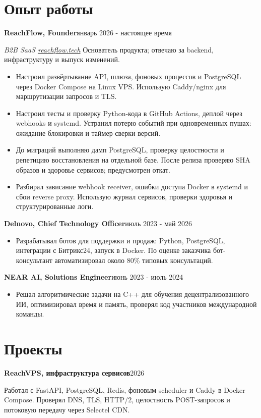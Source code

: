 \documentclass[10pt,a4paper]{article}
\newcommand{\role}[2]{\textbf{#1}\hfill #2\par}
\begin{document}
\section{Опыт работы}
\role{ReachFlow, Founder}{январь 2026 - настоящее время}
\textit{B2B SaaS \textperiodcentered{} \href{https://reachflow.tech}{reachflow.tech}}
Основатель продукта; отвечаю за backend, инфраструктуру и выпуск изменений.
\begin{itemize}
  \item Настроил развёртывание API, шлюза, фоновых процессов и PostgreSQL через Docker Compose
        на Linux VPS. Использую Caddy/nginx для маршрутизации запросов и TLS.
  \item Настроил тесты и проверку Python-кода в GitHub Actions, деплой через webhooks и systemd.
        Устранил потерю событий при одновременных пушах: ожидание блокировки и таймер сверки версий.
  \item До миграций выполняю дамп PostgreSQL, проверку целостности и репетицию восстановления
        на отдельной базе. После релиза проверяю SHA образов и здоровье сервисов; предусмотрен откат.
  \item Разбирал зависание webhook receiver, ошибки доступа Docker в systemd и сбои reverse proxy.
        Использую журнал сервисов, проверки здоровья и структурированные логи.
\end{itemize}
\vspace{2pt}

\role{Delnovo, Chief Technology Officer}{июль 2023 - май 2026}
\begin{itemize}
  \item Разрабатывал ботов для поддержки и продаж: Python, PostgreSQL, интеграции с Битрикс24,
        запуск в Docker. По оценке заказчика бот-консультант автоматизировал около 80\%
        типовых консультаций.
\end{itemize}
\vspace{2pt}

\role{NEAR AI, Solutions Engineer}{июнь 2023 - июль 2024}
\begin{itemize}
  \item Решал алгоритмические задачи на C++ для обучения децентрализованного ИИ,
        оптимизировал время и память, проверял код участников международной команды.
\end{itemize}

\section{Проекты}
\role{ReachVPS, инфраструктура сервисов}{2026}
Работал с FastAPI, PostgreSQL, Redis, фоновым scheduler и Caddy в Docker Compose.
Проверял DNS, TLS, HTTP/2, целостность POST-запросов и потоковую передачу через Selectel CDN.
\end{document}
